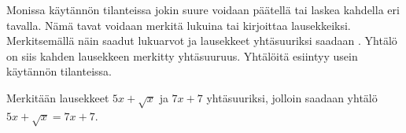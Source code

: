 Monissa käytännön tilanteissa jokin suure voidaan päätellä tai laskea kahdella eri tavalla. Nämä tavat voidaan merkitä lukuina tai kirjoittaa lausekkeiksi. Merkitsemällä näin saadut lukuarvot ja lausekkeet yhtäsuuriksi saadaan . Yhtälö on siis kahden lausekkeen merkitty yhtäsuuruus. Yhtälöitä esiintyy usein käytännön tilanteissa.

\begin{esimerkki}
Merkitään lausekkeet $5x+\sqrt{x}$ ja $7x+7$ yhtäsuuriksi, jolloin saadaan
yhtälö $5x+\sqrt{x} = 7x+7$.
\end{esimerkki}


\begin{esimerkki}
\begin{alakohdat}
\end{alakohdat}
\end{esimerkki}


